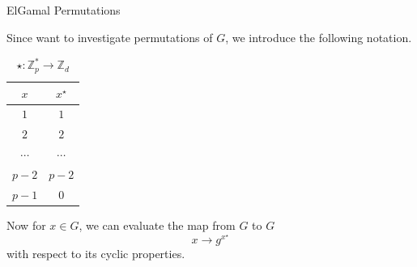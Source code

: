 \begin{frame}{ElGamal Permutations}

\begin{center}
Since want to investigate permutations of $G$, we introduce the following notation.
\end{center}
\vspace{10pt}

\begin{minipage}{.5\textwidth}
	\begin{table}[]
	    \centering
	    \begin{tabular}{c|c}
	        $x$ & $x^\star$ \\ \hline \hline
	        $1$ & $1$ \\
	        $2$ & $2$ \\
	        $\cdots$ & $\cdots$ \\
	        $p-2$ & $p-2$ \\
	        $p-1$ & $0$ 
	    \end{tabular}
	     \caption{$\star: \mathbb{Z}_p^* \rightarrow \mathbb{Z}_d$}
	    \label{tab:xmap}
	\end{table}
\end{minipage}%
\begin{minipage}{0.5\textwidth}
    Now for $x\in G$, we can evaluate the map from $G$ to $G$
    $$x \to g^{x^\star}$$ 
     with respect to its cyclic properties.
\end{minipage}

    
\end{frame}




